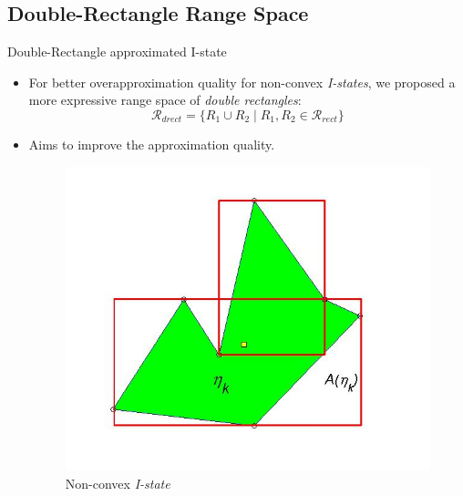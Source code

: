 \documentclass[10pt]{beamer}
\begin{document}
\subsection[Double-Rectangle Range Space]{Double-Rectangle Range Space}
\begin{frame}{Double-Rectangle approximated I-state}
  \begin{itemize}
  \item  For better overapproximation quality for non-convex \emph{I-states},
    we proposed a more expressive range space of \emph{double rectangles}: \\
    \begin{equation}
      \mathcal{R}_{drect} = \{ R_1 \cup R_2 \mid R_1, R_2 \in \mathcal{R}_{rect} \}
    \end{equation}
  \item Aims to improve the approximation quality.
    \begin{figure}
      \includegraphics[scale=0.26]{figs/poly.jpg}
      \caption{Non-convex \emph{I-state}}
    \end{figure}
  \end{itemize}
\end{frame}
\end{document}

